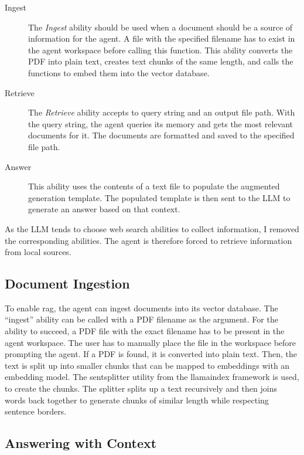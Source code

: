 \documentclass[../main.tex]{subfiles}
\begin{document}
\begin{description}
    \item[Ingest] The \emph{Ingest} ability should be used
          when a document should be a source of information for the agent.
          A file with the specified filename has to exist in the agent workspace before calling this function.
          This ability converts the PDF into plain text, creates text chunks of the same length,
          and calls the functions to embed them into the vector database.
    \item[Retrieve] The \emph{Retrieve} ability accepts to query string and an output file path.
          With the query string, the agent queries its memory and gets the most relevant documents for it.
          The documents are formatted and saved to the specified file path.
    \item[Answer] This ability uses the contents of a text file to populate the augmented generation template.
          The populated template is then sent to the LLM to generate an answer based on that context.

\end{description}

As the LLM tends to choose web search abilities to collect information, I removed the corresponding abilities.
The agent is therefore forced to retrieve information from local sources.

\subsection{Document Ingestion}

To enable \gls{rag},
the agent can ingest documents into its vector database.
The “ingest” ability can be called with a PDF filename as the argument.
For the ability to succeed, a PDF file with the exact filename has to be present
in the agent workspace.
The user has to manually place the file in the workspace before prompting the agent.
If a PDF is found, it is converted into plain text.
Then, the text is split up into smaller chunks that can be mapped to embeddings
with an embedding model.
The \gls{sentsplitter} utility from the \gls{llamaindex} framework \cite{zotero-255} is used,
to create the chunks.
The splitter splits up a text recursively and then joins words back together to
generate chunks of similar length while respecting sentence borders.

\subsection{Answering with Context}
\end{document}
